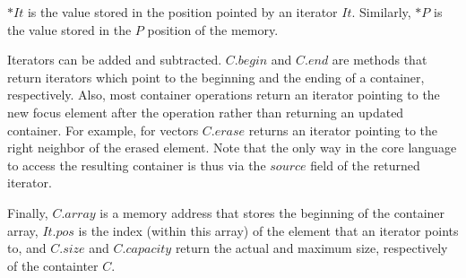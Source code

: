 \documentclass[conference]{IEEEtran}
\begin{document}
$\mathit{*It}$ is the value stored in the position pointed
by an iterator $\mathit{It}$. Similarly, $\mathit{*P}$ is the value
stored in the $\mathit{P}$ position of the memory.

Iterators can be added and subtracted.  $\mathit{C.begin}$ and $\mathit{C.end}$
are methods that return iterators which point to the beginning and the ending
of a container, respectively.  Also, most container operations return an
iterator pointing to the new focus element after the operation rather than
returning an updated container. For example, for vectors $\mathit{C.erase}$
returns an iterator pointing to the right neighbor of the erased element.
Note that the only way in the core language to access the resulting container
is thus via the $\mathit{source}$ field of the returned iterator.

Finally, $\mathit{C.array}$ is a memory address that stores the beginning of
the container array, $\mathit{It.pos}$ is the index (within this array) of the
element that an iterator points to, and $\mathit{C.size}$ and
$\mathit{C.capacity}$ return the actual and maximum size, respectively of the
containter $C$.
\end{document}
